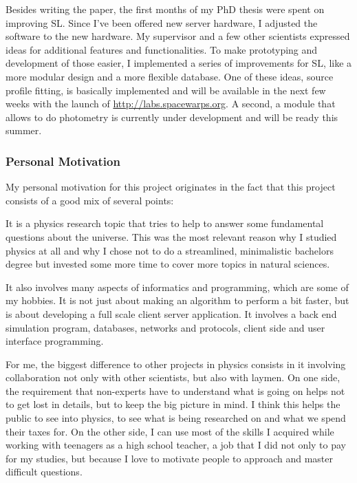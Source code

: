 \documentclass[11pt]{article}
\begin{document}
Besides writing the paper, the first months of my PhD thesis were spent on improving SL. %
Since I've been offered new server hardware, I adjusted the software to the new hardware.
My supervisor and a few other scientists expressed ideas for additional features and functionalities.
To make prototyping and development of those easier, I implemented a series of improvements for SL, like a more modular design and a more flexible database.
One of these ideas, source profile fitting, is basically implemented and will be available in the next few weeks with the launch of \url{http://labs.spacewarps.org}.
A second, a module that allows to do photometry is currently under development and will be ready this summer.





\subsubsection{Personal Motivation}

My personal motivation for this project originates in the fact that this project consists of a good mix of several points:

It is a physics research topic that tries to help to answer some fundamental questions about the universe.
This was the most relevant reason why I studied physics at all and why I chose not to do a streamlined, minimalistic bachelors degree but invested some more time to cover more topics in natural sciences.

It also involves many aspects of informatics and programming, which are some of my hobbies.
It is not just about making an algorithm to perform a bit faster, but is about developing a full scale client server application. It involves a back end simulation program, databases, networks and protocols, client side and user interface programming.

For me, the biggest difference to other projects in physics consists in it involving collaboration not only with other scientists, but also with laymen.
On one side, the requirement that non-experts have to understand what is going on helps not to get lost in details, but to keep the big picture in mind.
I think this helps the public to see into physics, to see what is being researched on and what we spend their taxes for.
On the other side, I can use most of the skills I acquired while working with teenagers as a high school teacher, a job that I did not only to pay for my studies, but because I love to motivate people to approach and master difficult questions.
\end{document}
